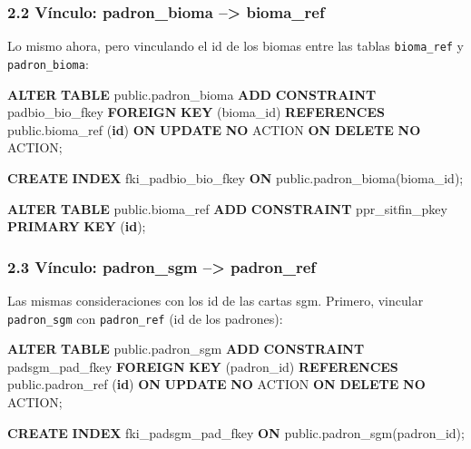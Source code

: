 \documentclass[spanish,]{article}
\newenvironment{Shaded}{}{}
\newcommand{\KeywordTok}[1]{\textcolor[rgb]{0.00,0.44,0.13}{\textbf{{#1}}}}
\newcommand{\NormalTok}[1]{{#1}}
\begin{document}
\subsubsection{2.2 Vínculo: padron\_bioma --\textgreater{}
bioma\_ref}\label{vuxednculo-padronux5fbioma-biomaux5fref}

Lo mismo ahora, pero vinculando el id de los biomas entre las tablas
\texttt{bioma\_ref} y \texttt{padron\_bioma}:

\begin{Shaded}
\begin{Highlighting}[]
\KeywordTok{ALTER} \KeywordTok{TABLE} \NormalTok{public.padron_bioma}
  \KeywordTok{ADD} \KeywordTok{CONSTRAINT} \NormalTok{padbio_bio_fkey }\KeywordTok{FOREIGN} \KeywordTok{KEY} \NormalTok{(bioma_id) }\KeywordTok{REFERENCES} 
      \NormalTok{public.bioma_ref (}\KeywordTok{id}\NormalTok{)}
   \KeywordTok{ON} \KeywordTok{UPDATE} \KeywordTok{NO} \NormalTok{ACTION }\KeywordTok{ON} \KeywordTok{DELETE} \KeywordTok{NO} \NormalTok{ACTION;}

\KeywordTok{CREATE} \KeywordTok{INDEX} \NormalTok{fki_padbio_bio_fkey}
    \KeywordTok{ON} \NormalTok{public.padron_bioma(bioma_id);}

\KeywordTok{ALTER} \KeywordTok{TABLE} \NormalTok{public.bioma_ref}
  \KeywordTok{ADD} \KeywordTok{CONSTRAINT} \NormalTok{ppr_sitfin_pkey }\KeywordTok{PRIMARY} \KeywordTok{KEY} \NormalTok{(}\KeywordTok{id}\NormalTok{);}
\end{Highlighting}
\end{Shaded}

\subsubsection{2.3 Vínculo: padron\_sgm --\textgreater{}
padron\_ref}\label{vuxednculo-padronux5fsgm-padronux5fref}

Las mismas consideraciones con los id de las cartas sgm. Primero,
vincular \texttt{padron\_sgm} con \texttt{padron\_ref} (id de los
padrones):

\begin{Shaded}
\begin{Highlighting}[]
\KeywordTok{ALTER} \KeywordTok{TABLE} \NormalTok{public.padron_sgm}
  \KeywordTok{ADD} \KeywordTok{CONSTRAINT} \NormalTok{padsgm_pad_fkey }\KeywordTok{FOREIGN} \KeywordTok{KEY} \NormalTok{(padron_id) }\KeywordTok{REFERENCES}
      \NormalTok{public.padron_ref (}\KeywordTok{id}\NormalTok{)}
   \KeywordTok{ON} \KeywordTok{UPDATE} \KeywordTok{NO} \NormalTok{ACTION }\KeywordTok{ON} \KeywordTok{DELETE} \KeywordTok{NO} \NormalTok{ACTION;}

\KeywordTok{CREATE} \KeywordTok{INDEX} \NormalTok{fki_padsgm_pad_fkey}
    \KeywordTok{ON} \NormalTok{public.padron_sgm(padron_id);}
\end{Highlighting}
\end{Shaded}
\end{document}
